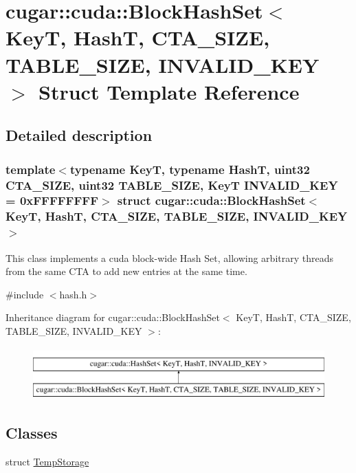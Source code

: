 \hypertarget{structcugar_1_1cuda_1_1_block_hash_set}{}\section{cugar\+:\+:cuda\+:\+:Block\+Hash\+Set$<$ KeyT, HashT, C\+T\+A\+\_\+\+S\+I\+ZE, T\+A\+B\+L\+E\+\_\+\+S\+I\+ZE, I\+N\+V\+A\+L\+I\+D\+\_\+\+K\+EY $>$ Struct Template Reference}
\label{structcugar_1_1cuda_1_1_block_hash_set}


\subsection{Detailed description}
\subsubsection*{template$<$typename KeyT, typename HashT, uint32 C\+T\+A\+\_\+\+S\+I\+ZE, uint32 T\+A\+B\+L\+E\+\_\+\+S\+I\+ZE, KeyT I\+N\+V\+A\+L\+I\+D\+\_\+\+K\+EY = 0x\+F\+F\+F\+F\+F\+F\+FF$>$\newline
struct cugar\+::cuda\+::\+Block\+Hash\+Set$<$ Key\+T, Hash\+T, C\+T\+A\+\_\+\+S\+I\+Z\+E, T\+A\+B\+L\+E\+\_\+\+S\+I\+Z\+E, I\+N\+V\+A\+L\+I\+D\+\_\+\+K\+E\+Y $>$}

This class implements a cuda block-\/wide Hash Set, allowing arbitrary threads from the same C\+TA to add new entries at the same time. 

{\ttfamily \#include $<$hash.\+h$>$}

Inheritance diagram for cugar\+:\+:cuda\+:\+:Block\+Hash\+Set$<$ KeyT, HashT, C\+T\+A\+\_\+\+S\+I\+ZE, T\+A\+B\+L\+E\+\_\+\+S\+I\+ZE, I\+N\+V\+A\+L\+I\+D\+\_\+\+K\+EY $>$\+:\begin{figure}[H]
\begin{center}
\leavevmode
\includegraphics[height=2.000000cm]{structcugar_1_1cuda_1_1_block_hash_set}
\end{center}
\end{figure}
\subsection*{Classes}
\begin{DoxyCompactItemize}
\item 
struct \hyperlink{structcugar_1_1cuda_1_1_block_hash_set_1_1_temp_storage}{Temp\+Storage}
\end{DoxyCompactItemize}
